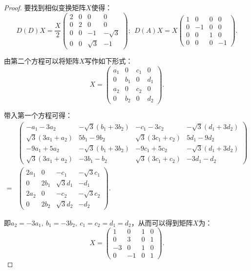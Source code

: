 \documentclass[reqno,a4paper,12pt]{amsart}
\begin{document}
\begin{enumerate}[1.]
\begin{proof}
要找到相似变换矩阵$X$使得：
\[
	D(D)X = \frac{X}{2} \left( \begin{matrix}
		2 & 0 & 0 & 0 \\
		0 & 2 & 0 & 0 \\
		0 & 0 & -1 & -\sqrt{3} \\
		0 & 0 & \sqrt{3} & -1
	\end{matrix} \right); \ \ 
	D(A)X = X \left( \begin{matrix}
		1 & 0 & 0 & 0 \\
		0 & -1 & 0 & 0 \\
		0 & 0 & 1 & 0 \\
		0 & 0 & 0 & -1
	\end{matrix} \right).
\]

由第二个方程可以将矩阵$X$写作如下形式：
\[
	X = \left( \begin{matrix}
		a_1 & 0 & c_1 & 0 \\
		0 & b_1 & 0 & d_1 \\
		a_2 & 0 & c_2 & 0 \\
		0 & b_2 & 0 & d_2
	\end{matrix} \right).
\]

带入第一个方程可得：
\begin{equation*}
\begin{split}
	&\left( \begin{matrix}
		-a_1-3a_2 & -\sqrt{3}(b_1+3b_2) & -c_1-3c_2 & -\sqrt{3}(d_1+3d_2) \\
		\sqrt{3}(3a_1+a_2) & 5b_1-9b_2 & \sqrt{3}(3c_1+c_2) & 5d_1-9d_2 \\
		-9a_1+5a_2 & -\sqrt{3}(b_1+3b_2) & -9c_1+5c_2 & -\sqrt{3}(d_1+3d_2) \\
		\sqrt{3}(3a_1+a_2) & -3b_1-b_2 & \sqrt{3}(3c_1+c_2) & -3d_1-d_2
	\end{matrix} \right) \\
	=&\left( \begin{matrix}
		2a_1 & 0 & -c_1 & -\sqrt{3}c_1 \\
		0 & 2b_1 & \sqrt{3}d_1 & -d_1 \\
		2a_2 & 0 & -c_2 & -\sqrt{3}c_2 \\
		0 & 2b_2 & \sqrt{3}d_2 & -d_2
	\end{matrix} \right).
\end{split}
\end{equation*}

即$a_2 = -3a_1, \ b_1 = -3b_2, \ c_1 = c_2 = d_1 = d_2$，从而可以得到矩阵$X$为：
\[
	X = \left( \begin{matrix}
		1 & 0 & 1 & 0 \\
		0 & 3 & 0 & 1 \\
		-3 & 0 & 1 & 0 \\
		0 & -1 & 0 & 1
	\end{matrix} \right).
\]


\end{proof}
\end{enumerate}
\end{document}
